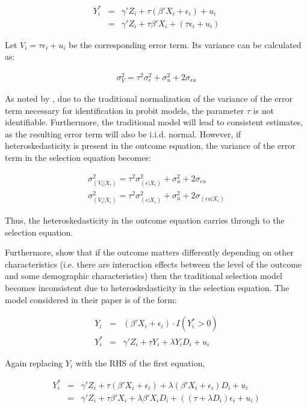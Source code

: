 \documentclass{article}
\begin{document}
\begin{eqnarray*}
Y^*_i&=&\gamma'Z_i +\tau(\beta'X_i + \epsilon_i) + u_i \\
     &=&\gamma'Z_i +\tau\beta'X_i + (\tau\epsilon_i + u_i)
\end{eqnarray*}

Let $V_i = \tau\epsilon_i + u_i$ be the corresponding error term.  Its variance can be calculated as:

\begin{eqnarray*}
\sigma_{V}^2=\tau^2\sigma_{\epsilon}^2 +\sigma_{u}^2 + 2\sigma_{\epsilon u}
\end{eqnarray*}

As noted by \citet{reichert2014}, due to the traditional normalization of the variance of the error term necessary for identification in probit models, the parameter $\tau$ is not identifiable.  Furthermore, the traditional \citet{heckman1979} model will lead to consistent estimates, as the resulting error term will also be i.i.d. normal.  However, if heteroskedasticity is present in the outcome equation, the variance of the error term in the selection equation becomes:

\begin{eqnarray*}
\sigma_{(V_i|X_i)}^2=\tau^2\sigma_{(\epsilon|X_i)}^2 +\sigma_{u}^2 + 2\sigma_{\epsilon u}  \\
\sigma_{(V_i|X_i)}^2=\tau^2\sigma_{(\epsilon|X_i)}^2 +\sigma_{u}^2 + 2\sigma_{(\epsilon u | X_i)}
\end{eqnarray*}

Thus, the heteroskedasticity in the outcome equation carries through to the selection equation.

Furthermore, \citet{reichert2014} show that if the outcome matters differently depending on other characteristics (i.e. there are interaction effects between the level of the outcome and some demographic characteristics) then the traditional selection model becomes inconsistent due to heteroskedasticity in the selection equation.  The model considered in their paper is of the form:

\begin{eqnarray*}
Y_i&=&(\beta'X_i + \epsilon_i)\cdot I(Y^*_i>0) \\
Y^*_i&=&\gamma'Z_i +\tau Y_i +\lambda Y_iD_i + u_i
\end{eqnarray*}

Again replacing $Y_i$ with the RHS of the first equation,

\begin{eqnarray*}
Y^*_i&=&\gamma'Z_i +\tau(\beta'X_i + \epsilon_i) + \lambda (\beta'X_i + \epsilon_i)D_i + u_i \\
     &=&\gamma'Z_i +\tau\beta'X_i + \lambda\beta'X_iD_i+((\tau+\lambda D_i)\epsilon_i + u_i)
\end{eqnarray*}
\end{document}
